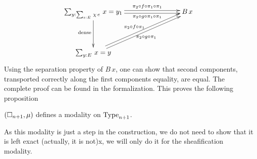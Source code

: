 \[\xymatrix@C=8em@R=4em{
  \sumD y {\sumD e E {\chi\,
  e}} {x=y_1} \ar@<2pt>[r]^{\qquad \pi_2\circ f\circ\pi_1\circ \pi_1}
\ar@<-2pt>[r]_{\qquad \pi_2\circ g\circ \pi_1\circ \pi_1}
\ar[d]_{\mathrm{dense}}& B\,x \\
  \sumD y E {x = y} \ar@<2pt>[ur]^{\pi_2\circ f\circ \pi_1} \ar@<-2pt>[ur]_{\pi_2\circ g\circ \pi_1}&
}\]%
Using the separation property of $B\,x$, one can show that second
components, transported correctly along the first components equality,
are equal. The complete proof can be found in the formalization.
This proves the following proposition
\begin{prop}\label{prop:sep-mod}
  $(\mathop{\square_{n+1}},\mu)$ defines a modality on $\operatorname{Type}_{n+1}$.
\end{prop}

As this modality is just a step in the construction, we do not need to
show that it is left exact (actually, it is not)x, we will only do it for the sheafification
modality.
